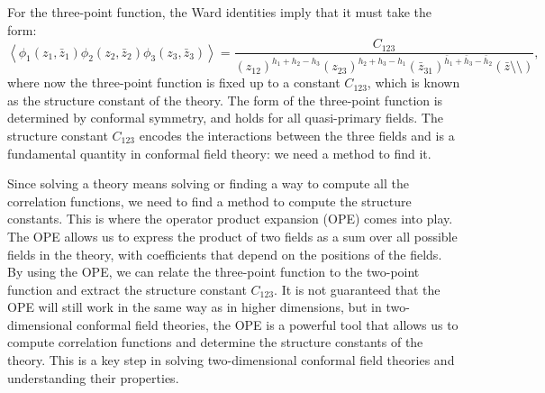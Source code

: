 For the three-point function, the Ward identities imply that it must take the form:
\[
    \left\langle \phi_1(z_1,\bar{z}_1) \phi_2(z_2,\bar{z}_2) \phi_3(z_3,\bar{z}_3) \right\rangle = \frac{C_{123}}{(z_{12})^{h_1 + h_2 - h_3} (z_{23})^{h_2 + h_3 - h_1}  (\bar{z}_{31})^{\bar{h}_1 + \bar{h}_3 - \bar{h}_2} (\bar{z} \setminus  \setminus )},
\]
where now the three-point function is fixed up to a constant $C_{123}$, which is known as the structure constant of the theory. The form of the three-point function is determined by conformal symmetry, and holds for all quasi-primary fields. The structure constant $C_{123}$ encodes the interactions between the three fields and is a fundamental quantity in conformal field theory: we need a method to find it.

Since solving a theory means solving or finding a way to compute all the correlation functions, we need to find a method to compute the structure constants. This is where the operator product expansion (OPE) comes into play. The OPE allows us to express the product of two fields as a sum over all possible fields in the theory, with coefficients that depend on the positions of the fields. By using the OPE, we can relate the three-point function to the two-point function and extract the structure constant $C_{123}$. It is not guaranteed that the OPE will still work in the same way as in higher dimensions, but in two-dimensional conformal field theories, the OPE is a powerful tool that allows us to compute correlation functions and determine the structure constants of the theory. This is a key step in solving two-dimensional conformal field theories and understanding their properties.


